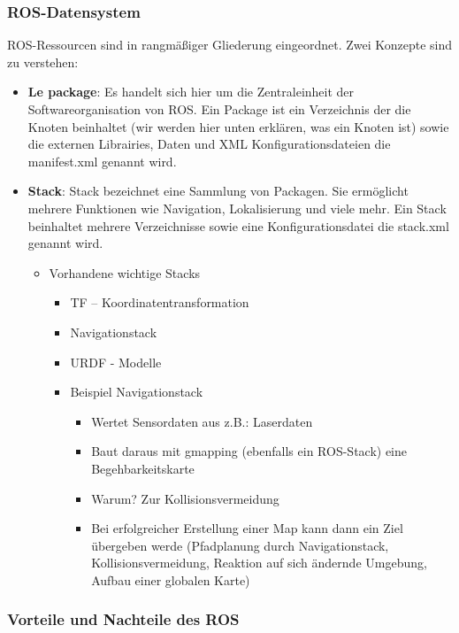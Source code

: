 \subsubsection*{ROS-Datensystem}
ROS-Ressourcen sind in rangmäßiger Gliederung eingeordnet. Zwei Konzepte sind zu
verstehen:
\begin{itemize}
\item \textbf{Le package}: Es handelt sich hier um die Zentraleinheit der Softwareorganisation von
ROS. Ein Package ist ein Verzeichnis der die Knoten beinhaltet (wir werden hier
unten erklären, was ein Knoten ist) sowie die externen Librairies, Daten und XML
Konfigurationsdateien die manifest.xml genannt wird.
\item \textbf{Stack}: Stack bezeichnet eine Sammlung von Packagen. Sie ermöglicht mehrere
Funktionen wie Navigation, Lokalisierung und viele mehr. Ein Stack beinhaltet
mehrere Verzeichnisse sowie eine Konfigurationsdatei die stack.xml genannt wird.
\begin{itemize}
\item Vorhandene wichtige Stacks
\begin{itemize}
\item TF – Koordinatentransformation
\item Navigationstack
\item URDF - Modelle
\end{itemize}
\begin{itemize}
\item Beispiel Navigationstack
\begin{itemize}
\item Wertet Sensordaten aus z.B.: Laserdaten
\item Baut daraus mit gmapping (ebenfalls ein ROS-Stack) eine Begehbarkeitskarte
\item Warum? Zur Kollisionsvermeidung
\item Bei erfolgreicher Erstellung einer Map kann dann ein Ziel übergeben werde (Pfadplanung durch Navigationstack,
Kollisionsvermeidung, Reaktion auf sich ändernde Umgebung, Aufbau einer globalen Karte)
\end{itemize}
\end{itemize}
\end{itemize}
\end{itemize}
\subsubsection*{Vorteile und Nachteile des ROS}
